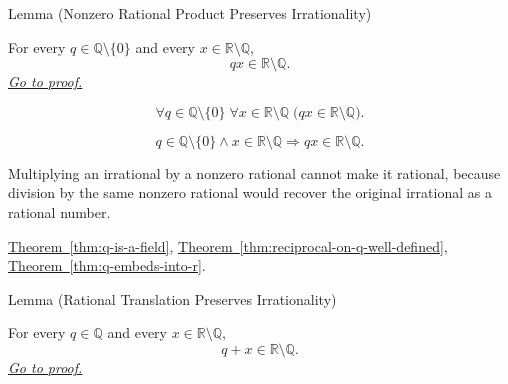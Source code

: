 \begin{lemmabox}{Lemma (Nonzero Rational Product Preserves Irrationality)}
\begin{lemma}
\label{lem:nonzero-rational-product-preserves-irrationality}
For every $q\in\mathbb{Q}\setminus\{0\}$ and every
$x\in\mathbb{R}\setminus\mathbb{Q}$,
\[
  qx\in\mathbb{R}\setminus\mathbb{Q}.
\]
\hyperref[prf:nonzero-rational-product-preserves-irrationality]{\textit{Go to proof.}}
\end{lemma}
\end{lemmabox}

\begin{remark*}
\[
\forall q\in\mathbb{Q}\setminus\{0\}\;\forall x\in\mathbb{R}\setminus\mathbb{Q}\;
\bigl(qx\in\mathbb{R}\setminus\mathbb{Q}\bigr).
\]
\end{remark*}

\begin{remark*}
\[
q\in\mathbb{Q}\setminus\{0\}\land x\in\mathbb{R}\setminus\mathbb{Q}
\Longrightarrow qx\in\mathbb{R}\setminus\mathbb{Q}.
\]
\end{remark*}

\begin{remark*}[Interpretation]
Multiplying an irrational by a nonzero rational cannot make it rational,
because division by the same nonzero rational would recover the original
irrational as a rational number.
\end{remark*}

\begin{dependencies}
\hyperref[thm:q-is-a-field]{Theorem~\ref*{thm:q-is-a-field}},
\hyperref[thm:reciprocal-on-q-well-defined]{Theorem~\ref*{thm:reciprocal-on-q-well-defined}},
\hyperref[thm:q-embeds-into-r]{Theorem~\ref*{thm:q-embeds-into-r}}.
\end{dependencies}

\begin{lemmabox}{Lemma (Rational Translation Preserves Irrationality)}
\begin{lemma}
\label{lem:rational-translation-preserves-irrationality}
For every $q\in\mathbb{Q}$ and every $x\in\mathbb{R}\setminus\mathbb{Q}$,
\[
  q+x\in\mathbb{R}\setminus\mathbb{Q}.
\]
\hyperref[prf:rational-translation-preserves-irrationality]{\textit{Go to proof.}}
\end{lemma}
\end{lemmabox}


